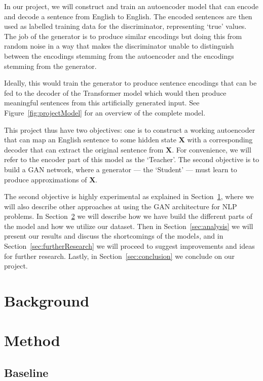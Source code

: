 \documentclass{article}
\begin{document}
In our project, we will construct and train an autoencoder model that can encode
and decode a sentence from English to English. The encoded sentences are then
used as labelled training data for the discriminator, representing `true'
values. The job of the generator is to produce similar encodings but doing this
from random noise in a way that makes the discriminator unable to distinguish
between the encodings stemming from the autoencoder and the encodings stemming
from the generator.

Ideally, this would train the generator to produce sentence encodings that can
be fed to the decoder of the Transformer model which would then produce
meaningful sentences from this artificially generated input. See
Figure~\ref{fig:projectModel} for an overview of the complete model.

This project thus have two objectives: one is to construct a working autoencoder
that can map an English sentence to some hidden state $\mathbf{X}$ with a
corresponding decoder that can extract the original sentence from $\mathbf{X}$.
For convenience, we will refer to the encoder part of this model as the
`Teacher'. The second objective is to build a GAN network, where a generator ---
the `Student' --- must learn to produce approximations of $\mathbf{X}$.

The second objective is highly experimental as explained in
Section~\ref{sec:background}, where we will also describe other approaches at
using the GAN architecture for NLP problems. In Section~\ref{sec:method} we will
describe how we have build the different parts of the model and how we utilize
our dataset. Then in Section~\ref{sec:analysis} we will present our results and
discuss the shortcomings of the model\(s\), and in
Section~\ref{sec:furtherResearch} we will proceed to suggest improvements and
ideas for further research. Lastly, in Section~\ref{sec:conclusion} we conclude
on our project.


\section{Background}\label{sec:background}

\lipsum[4]

\section{Method}\label{sec:method}


\subsection{Baseline}
\end{document}
